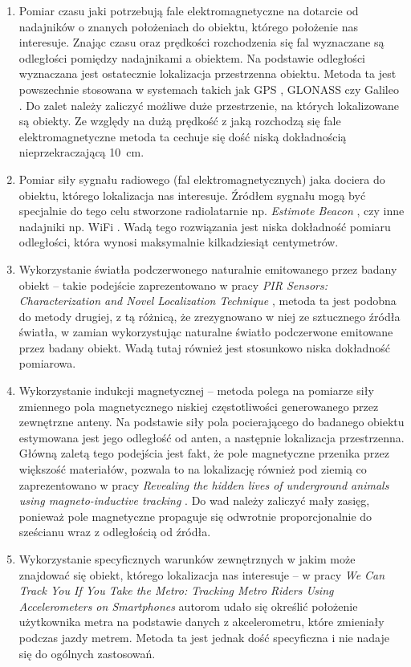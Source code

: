 \begin{enumerate}
 \item
 Pomiar czasu jaki potrzebują fale elektromagnetyczne na dotarcie od nadajników o znanych położeniach 
 do obiektu, którego położenie nas interesuje.
 Znając czasu oraz prędkości rozchodzenia się fal wyznaczane są odległości pomiędzy nadajnikami a obiektem.
 Na podstawie odległości wyznaczana jest ostatecznie lokalizacja przestrzenna obiektu. 
 Metoda ta jest powszechnie stosowana w systemach takich jak GPS \cite{bib:gps}, GLONASS \cite{bib:GLONASS} czy Galileo \cite{bib:galileo}.
 Do zalet należy zaliczyć możliwe duże przestrzenie, na których lokalizowane są obiekty.
 Ze względy na dużą prędkość z jaką rozchodzą się fale elektromagnetyczne metoda ta cechuje się dość niską 
 dokładnością nieprzekraczającą \SI{10}{cm}.
 
 \item
 Pomiar siły sygnału radiowego (fal elektromagnetycznych) jaka dociera do obiektu, którego lokalizacja nas interesuje.
 Źródłem sygnału mogą być specjalnie do tego celu stworzone radiolatarnie np. \textit{Estimote Beacon} \cite{bib:beacon},
 czy inne nadajniki np. WiFi \cite{bib:lokWiFi}.
 Wadą tego rozwiązania jest niska dokładność pomiaru odległości, która wynosi maksymalnie kilkadziesiąt centymetrów.  
 
 \item
 Wykorzystanie światła podczerwonego naturalnie emitowanego przez badany obiekt --
 takie podejście zaprezentowano w pracy \textit{PIR Sensors: Characterization and Novel Localization Technique}
 \cite{bib:PIRsens}, metoda ta jest podobna do metody drugiej, z tą różnicą, że zrezygnowano w niej
 ze sztucznego źródła światła, w zamian wykorzystując naturalne światło podczerwone emitowane 
 przez badany obiekt. Wadą tutaj również jest stosunkowo niska dokładność pomiarowa.
 
 \item
 Wykorzystanie indukcji magnetycznej --  metoda polega na pomiarze siły zmiennego pola magnetycznego niskiej częstotliwości
 generowanego przez zewnętrzne anteny. Na podstawie siły pola pocierającego do badanego obiektu estymowana jest jego odległość 
 od anten, a następnie lokalizacja przestrzenna.
 Główną zaletą tego podejścia jest fakt, że pole magnetyczne przenika przez większość materiałów, pozwala to na 
 lokalizację również pod ziemią co zaprezentowano w pracy 
 \textit{Revealing the hidden lives of underground animals using magneto-inductive tracking} \cite{bib:chomiki}. 
 Do wad należy zaliczyć mały zasięg, ponieważ pole magnetyczne propaguje się odwrotnie proporcjonalnie do sześcianu  
 wraz z odległością od źródła.
 
 \item 
 Wykorzystanie specyficznych warunków zewnętrznych w jakim może znajdować się obiekt, którego lokalizacja nas interesuje
 -- w pracy \textit{We Can Track You If You Take the Metro: Tracking Metro
Riders Using Accelerometers on Smartphones} \cite{bib:metro} autorom udało się określić położenie
użytkownika metra na podstawie danych z akcelerometru, które zmieniały podczas jazdy metrem.
Metoda ta jest jednak dość specyficzna i nie nadaje się do ogólnych zastosowań. 
 
\end{enumerate}
 

